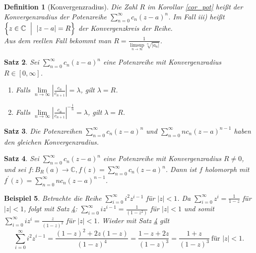 \documentclass[a4paper,12pt]{book}
\theoremstyle{newthm}
\newtheorem{thm}{Satz}[section]
\theoremstyle{newdef}
\newtheorem{defn}[thm]{Definition}
\theoremstyle{newrem}
\newtheorem{exmp}[thm]{Beispiel}
\newcommand{\C}{\mathbb{C}}
\begin{document}
		\begin{defn}[Konvergenzradius]
			Die Zahl $R$ im Korollar \ref{cor_pot} heißt der \emph{Konvergenzradius der Potenzreihe} $ \sum\limits_{n=0}^\infty c_n (z-a)^n $. Im Fall \textit{iii)} heißt $ \Bigl\{ z \in \C\ \Bigm|\ |z-a|=R \Bigr\} $ der \emph{Konvergenzkreis der Reihe}.\\
			Aus dem reellen Fall bekommt man $ R = \frac{1}{\limsup\limits_{n \to \infty}\sqrt[n]{|a_n|}} $.
		\end{defn}
		
		\begin{thm}
			Sei $ \sum\limits_{n=0}^\infty c_n (z-a)^n $ eine Potenzreihe mit Konvergenzradius $ R \in [0,\infty] $.
			\begin{enumerate}[label = {\roman*})]
				\item Falls $ \lim\limits_{n \to \infty} \left|\frac{c_n}{c_{n+1}}\right| = \lambda $, gilt $ \lambda = R $.
				\item Falls $ \lim\limits_{n \to \infty} \left|\frac{c_n}{c_{n+1}}\right|^{-\frac{1}{n}} = \lambda $, gilt $ \lambda = R $.
			\end{enumerate}
		\end{thm}
		
		\begin{thm}
			Die Potenzreihen $ \sum\limits_{n=0}^\infty c_n (z-a)^n $ und $ \sum\limits_{n=0}^\infty n c_n (z-a)^{n-1} $ haben den gleichen Konvergenzradius.
		\end{thm}
		\begin{thm}\label{thm_series}
			Sei $ \sum\limits_{n=0}^\infty c_n (z-a)^n $ eine Potenzreihe mit Konvergenzradius $R \neq 0$, und sei $ f: B_R(a) \to \C, f(z) = \sum\limits_{n=0}^\infty c_n (z-a)^n $. Dann ist $f$ holomorph mit $ f^\prime(z) = \sum\limits_{n=0}^\infty n c_n (z-a)^{n-1} $.
		\end{thm}
		
		\begin{exmp}
			Betrachte die Reihe $ \sum\limits_{i=0}^\infty i^2 z^{i-1} $ für $|z| < 1$. Da $ \sum\limits_{i=0}^\infty z^{i} = \frac{1}{1-z} $ für $|z|<1$, folgt mit Satz \ref{thm_series}: $ \sum\limits_{i=0}^\infty i z^{i-1} = \frac{1}{(1-z^2)} $ für $|z|<1$ und somit $ \sum\limits_{i=0}^\infty i z^{i} = \frac{z}{(1-z)^2} $ für $|z|<1$. Wieder mit Satz \ref{thm_series} gilt
			\[ \sum\limits_{i=0}^\infty i^2 z^{i-1} = \frac{(1-z)^2+2z(1-z)}{(1-z)^4} = \frac{1-z+2z}{(1-z)^3} = \frac{1+z}{(1-z)^3}\ \text{für } |z|<1. \]
		\end{exmp}
		
\end{document}
